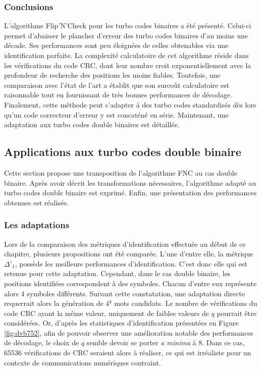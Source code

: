 \subsubsection{Conclusions}
L'algorithme Flip'N'Check pour les turbo codes binaires a été présenté. Celui-ci permet d'abaisser le plancher d'erreur 
des turbo codes binaires d'au moins une décade. Ses performances sont peu éloignées de celles obtenables via une 
identification parfaite. La complexité calculatoire de cet algorithme réside dans les vérifications du code CRC, dont leur 
nombre croit exponentiellement avec la profondeur de recherche des positions les moins fiables. Toutefois, une 
comparaison avec l'état de l'art a établit que son surcoût calculatoire est raisonnable tout en fournissant de très bonnes 
performances de décodage. Finalement, cette méthode peut s'adapter à des turbo codes standardisés dès lors qu'un code 
correcteur d'erreur y est concaténé en série. Maintenant, une adaptation aux turbo codes double binaires est détaillée.


\subsection{Applications aux turbo codes double binaire}
Cette section propose une transposition de l'algorithme FNC au cas double binaire. Après avoir décrit les transformations 
nécessaires, l'algorithme adapté au turbo codes double binaire est exprimé. Enfin, une présentation des performances obtenues 
est réalisée.
\subsubsection{Les adaptations}
Lors de la comparaison des métriques d'identification effectuée au début de ce chapitre, plusieurs propositions ont été 
comparée. L'une d'entre elle, la métrique $\Delta'_1$, possède les meilleurs performances d'identification. C'est donc
elle qui est retenue pour cette adaptation. Cependant, dans le cas double binaire, les positions identifiées correspondent 
à des symboles. Chacun d'entre eux représente alors 4 symboles différents. Suivant cette constatation, une adaptation directe 
requerrait alors la génération de $4^q$ mots candidats. Le nombre de vérifications du code CRC ayant la même valeur, 
uniquement de faibles valeurs de $q$ pourrait être considérées. Or, d'après les statistiques d'identification présentées en Figure 
\ref{fig:dvb752}, afin de pouvoir observer une amélioration notable des performances de décodage, le choix de $q$ semble
devoir se porter \textit{a minima} à 8. Dans ce cas, 65536 vérifications de CRC seraient alors à réaliser, ce qui est 
irréaliste pour un contexte de communications numériques contraint.

